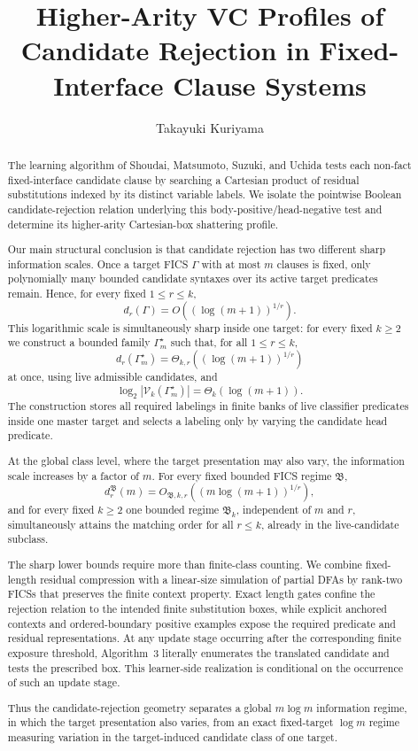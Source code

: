 \documentclass[11pt]{article}
\title{Higher-Arity VC Profiles of Candidate Rejection in Fixed-Interface Clause Systems}
\author{Takayuki Kuriyama}
\date{}
\theoremstyle{definition}
\theoremstyle{remark}
\begin{document}
\maketitle

\begin{abstract}
The learning algorithm of Shoudai, Matsumoto, Suzuki, and Uchida tests each
non-fact fixed-interface candidate clause by searching a Cartesian product of
residual substitutions indexed by its distinct variable labels.  We isolate
the pointwise Boolean candidate-rejection relation underlying this
body-positive/head-negative test and determine its higher-arity Cartesian-box
shattering profile.

Our main structural conclusion is that candidate rejection has two different
sharp information scales.  Once a target FICS \(\Gamma\) with at most \(m\)
clauses is fixed, only polynomially many bounded candidate syntaxes over its
active target predicates remain.
Hence, for every fixed \(1\le r\le k\),
\[
d_r(\Gamma)
=
O((\log(m+1))^{1/r}).
\]
This logarithmic scale is simultaneously sharp inside one target: for every
fixed \(k\ge2\) we construct a bounded family \(\Gamma_m^\star\) such that,
for all \(1\le r\le k\),
\[
d_r(\Gamma_m^\star)
=
\Theta_{k,r}((\log(m+1))^{1/r})
\]
at once, using live admissible candidates, and
\[
\log_2|\mathcal V_k(\Gamma_m^\star)|
=
\Theta_k(\log(m+1)).
\]
The construction stores all required labelings in finite banks of live
classifier predicates inside one master target and selects a labeling only by
varying the candidate head predicate.

At the global class level, where the target presentation may also vary, the
information scale increases by a factor of \(m\).  For every fixed bounded
FICS regime \(\mathfrak B\),
\[
d_r^{\mathfrak B}(m)
=
O_{\mathfrak B,k,r}((m\log(m+1))^{1/r}),
\]
and for every fixed \(k\ge2\) one bounded regime \(\mathfrak B_k\),
independent of \(m\) and \(r\), simultaneously attains the matching order for
all \(r\le k\), already in the live-candidate subclass.

The sharp lower bounds require more than finite-class counting.  We combine
fixed-length residual compression with a linear-size simulation of partial
DFAs by rank-two FICSs that preserves the finite context property.  Exact
length gates confine the rejection relation to the intended finite
substitution boxes, while explicit anchored contexts and ordered-boundary
positive examples expose the required predicate and residual representations.
At any update stage occurring after the corresponding finite exposure
threshold, Algorithm~3 literally enumerates the translated candidate and
tests the prescribed box.  This learner-side realization is conditional on
the occurrence of such an update stage.

Thus the candidate-rejection geometry separates a global \(m\log m\)
information regime, in which the target presentation also varies, from an
exact fixed-target \(\log m\) regime measuring variation in the target-induced
candidate class of one target.
\end{abstract}
\end{document}
